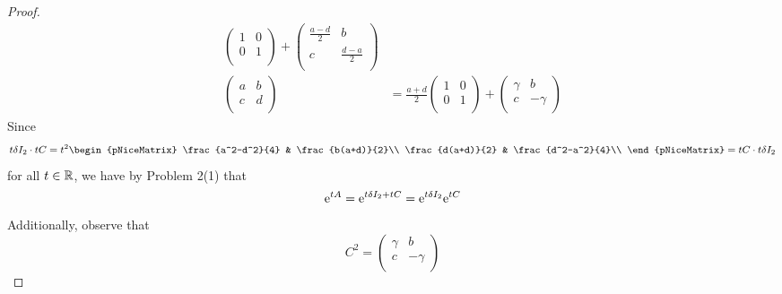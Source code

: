 \documentclass[../psets.tex]{subfiles}
\begin{document}
\begin{enumerate}
\begin{proof}
\begin{align*}
            \begin{pmatrix}
                1 & 0\\
                0 & 1\\
            \end{pmatrix}
            +
            \begin{pmatrix}
                \frac{a-d}{2} & b\\
                c & \frac{d-a}{2}\\
            \end{pmatrix}\\
            \begin{pmatrix}
                a & b\\
                c & d\\
            \end{pmatrix}
            &= \frac{a+d}{2}
            \begin{pmatrix}
                1 & 0\\
                0 & 1\\
            \end{pmatrix}
            +
            \begin{pmatrix}
                \gamma & b\\
                c & -\gamma\\
            \end{pmatrix}
        \end{align*}
        Since
        \begin{equation*}
            t\delta I_2\cdot tC = t^2
            \begin{pNiceMatrix}
                \frac{a^2-d^2}{4} & \frac{b(a+d)}{2}\\
                \frac{d(a+d)}{2} & \frac{d^2-a^2}{4}\\
            \end{pNiceMatrix}
            = tC\cdot t\delta I_2
        \end{equation*}
        for all $t\in\R$, we have by Problem 2(1) that
        \begin{equation*}
            \e[tA] = \e[t\delta I_2+tC]
            = \e[t\delta I_2]\e[tC]
        \end{equation*}
        Additionally, observe that
        \begin{equation*}
            C^2 =
            \begin{pmatrix}
                \gamma & b\\
                c & -\gamma\\

\end{pmatrix}
\end{equation*}
\end{proof}
\end{enumerate}
\end{document}
